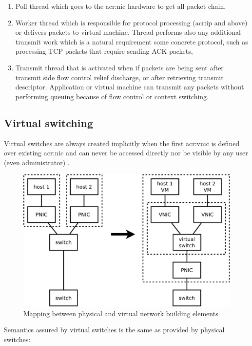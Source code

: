 \documentclass[11pt,openany]{book}
\begin{document}
        \begin{enumerate}
          \item Poll thread which goes to the \gls{acr:nic} hardware to get all packet chain,
          \item Worker thread which is responsible for protocol processing (\gls{acr:ip} and above) or delivers packets
                to virtual machine. Thread performs also any additional transmit work which is a natural requirement
                some concrete protocol, such as processing TCP packets that require sending ACK packets,
          \item Transmit thread that is activated when if packets are being sent after transmit side flow control relief
                discharge, or after retrieving transmit descriptor. Application or virtual machine can transmit any
                packets without performing queuing because of flow control or context switching.
        \end{enumerate}


      \subsection{Virtual switching}
        
        Virtual switches are always created implicitly when the first \gls{acr:vnic} is defined over existing
        \gls{acr:nic} and can never be accessed directly nor be visible by any user (even administrator)
        \cite{crossbow2}. 
        
        \begin{figure}[h]
          \centering
          \includegraphics[width=.7\textwidth]{img/solaris/mapping.pdf}

          \caption{Mapping between physical and virtual network building elements}
        \end{figure}
        
        Semantics assured by virtual switches is the same as provided by physical switches: 
\end{document}
